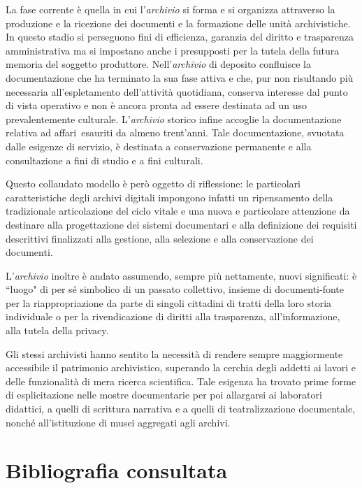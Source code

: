 \documentclass[
  b5paper,
  twoside,
  12pt,
  chapterprefix=false,
  bibliography=totocnumbered,
  parskip=false]{scrbook}
\begin{document}
La fase corrente è quella in cui l'\emph{archivio} si forma e si organizza
attraverso la produzione e la ricezione dei documenti e la formazione
delle unità archivistiche. In questo stadio si perseguono fini di
efficienza, garanzia del diritto e trasparenza amministrativa ma si
impostano anche i presupposti per la tutela della futura memoria del
soggetto produttore. Nell'\emph{archivio} di deposito confluisce la
documentazione che ha terminato la sua fase attiva e che, pur non
risultando più necessaria all'espletamento dell'attività quotidiana,
conserva interesse dal punto di vista operativo e non è ancora pronta ad
essere destinata ad un uso prevalentemente culturale. L'\emph{archivio}
storico infine accoglie la documentazione relativa ad affari~esauriti da
almeno trent'anni. Tale documentazione, svuotata dalle esigenze di
servizio, è destinata a conservazione permanente e alla consultazione a
fini di studio e a fini culturali.

Questo collaudato modello è però oggetto di riflessione: le particolari
caratteristiche degli archivi digitali impongono infatti un ripensamento
della tradizionale articolazione del ciclo vitale e una nuova e
particolare attenzione da destinare alla progettazione dei sistemi
documentari e alla definizione dei requisiti descrittivi finalizzati
alla gestione, alla selezione e alla conservazione dei documenti.

L'\emph{archivio} inoltre è andato assumendo, sempre più nettamente, nuovi
significati: è ``luogo" di per sé simbolico di un passato collettivo,
insieme di documenti-fonte per la riappropriazione da parte di singoli
cittadini di tratti della loro storia individuale o per la
rivendicazione di diritti alla trasparenza, all'informazione, alla
tutela della privacy.

Gli stessi archivisti hanno sentito la necessità di rendere sempre
maggiormente accessibile il patrimonio archivistico, superando la
cerchia degli addetti ai lavori e delle funzionalità di mera ricerca
scientifica. Tale esigenza ha trovato prime forme di esplicitazione
nelle mostre documentarie per poi allargarsi ai laboratori didattici, a
quelli di scrittura narrativa e a quelli di teatralizzazione
documentale, nonché all'istituzione di musei aggregati agli archivi.

\hypertarget{bibliografia-consultata}{%
\section*{Bibliografia consultata}\label{bibliografia-consultata}}
\end{document}
